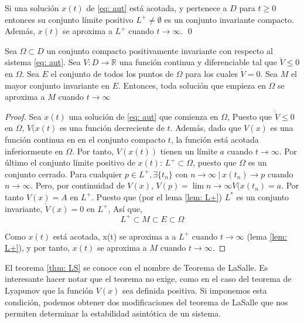\begin{lemma}\label{lem: L+}
Si una solución $x(t)$ de \ref{eq: aut}  está acotada, y pertenece a $D$ para $t \geq 0$ entonces su conjunto límite positivo  $L^+ \neq \emptyset$ es un conjunto invariante compacto. Además, $x(t)$ se aproxima a $L^+$ cuando $t \to \infty$.
\qed
\end{lemma}

\begin{theorem}\label{thm: LS}
Sea $\Omega \subset D$ un conjunto compacto positivamente invariante  con respecto al sistema \ref{eq: aut}. Sea $V:D\to \mathbb{R}$ una función continua y diferenciable tal que $\dot V \leq 0$ en $\Omega$. Sea $E$ el conjunto de todos los puntos de $\Omega$ para los cuales $\dot V = 0$. Sea $M$ el mayor conjunto invariante en $E$. Entonces, toda solución que empieza en $\Omega$ se aproxima a $M$ cuando $t\to \infty$
\end{theorem}
\begin{proof}
Sea $x(t)$ una solución de \ref{eq: aut} que comienza en $\Omega$,  Puesto que $\dot V\leq 0$ en $\Omega$, $V(x(t)$ es una función decreciente de $t$. Además, dado que $V(x)$ es una función continua en en el conjunto compacto $t$, la función está acotada inferiormente en $\Omega$. Por tanto,  $V(x(t))$ tienen un límite $a$ cuando $t\to \infty$. Por último el conjunto límite positivo de $x(t)$: $L^+ \subset \Omega$, puesto que $	\Omega$ es un conjunto cerrado.  Para cualquier $p \in L^+, \exists \{t_n\}$ con $n\to \infty \ | \ x(t_n)\to p$ cuando $n\to \infty$. Pero, por continuidad de $V(x)$, $V(p)= \lim{n\to \infty }V(x(t_n)=a$. Por tanto $V(x)=A$ en $L^+$. Puesto que (por el lema \ref{lem: L+}) $L^*$ es un conjunto invariante, $\dot V(x) = 0$ en $L^+$, Así que,
\begin{equation*}
L^+ \subset M \subset E \subset \Omega 
\end{equation*} 

Como $x(t)$ está acotada, x(t) se aproxima a a $L^+$ cuando $t\to \infty$ (lema \ref{lem: L+}), y por tanto, $x(t)$ se aproxima a $M$ cuando $t\to \infty$. 
\end{proof}

El teorema \ref{thm: LS} se conoce con el nombre de Teorema de LaSalle. Es interesante hacer notar que el teorema no exige, como en el caso del teorema de Lyapunov que la función $V(x)$ sea definida positiva. Si imponemos esta condición, podemos obtener dos modificaciones del teorema de LaSalle que nos permiten determinar la estabilidad asintótica de un sistema.

